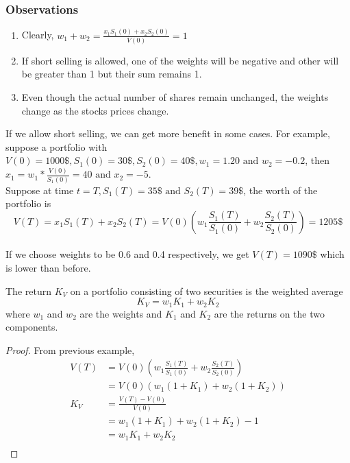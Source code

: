\subsubsection{Observations}
\begin{enumerate}
    \item Clearly, $w_{1}+w_{2}=\frac{x_{1}S_{1}(0)+x_{2}S_{2}(0)}{ V(0)}=1$
    \item If short selling is allowed, one of the weights will be negative and other will be greater than 1 but their sum remains 1.
    \item Even though the actual number of shares remain unchanged, the weights change as the stocks prices change.
\end{enumerate}
If we allow short selling, we can get more benefit in some cases. For example, suppose a portfolio with $V(0)=1000 \$, S_{1}(0)=30 \$, S_{2}(0)=40 \$, w_{1}=1.20 \text{ and } w_{2}=-0.2$, then $x_{1}=w_{1}*\frac{V(0)}{S_{1}(0)}=40 \text{ and } x_{2}=-5$.
\\Suppose at time $t=T, S_{1}(T)=35 \$ \text{ and } S_{2}(T)=39 \$$,
the worth of the portfolio is $$V(T)=x_{1}S_{1}(T)+x_{2}S_{2}(T)=V(0)\left( w_{1}\frac{S_{1}(T)}{S_{1}(0)}+w_{2}\frac{S_{2}(T)}{S_{2}(0)}\right)=1205 \$$$ 
\\If we choose weights to be 0.6 and 0.4 respectively, we get $V(T)=1090 \$$ which is lower than before. 
\newpage
\begin{theorem}
The return $K_{V}$ on a portfolio consisting of two securities is the weighted average 
\begin{equation}
    K_{V}=w_{1}K_{1}+w_{2}K_{2}
\end{equation}
where $w_{1}$ and $w_{2}$ are the weights and $K_{1}$ and $K_{2}$ are the returns on the two components.
\end{theorem}
\begin{proof}
From previous example, \\
\begin{align*}
    V(T)&= V(0)\left(w_{1}\frac{S_{1}(T)}{S_{1}(0)}+w_{2}\frac{S_{2}(T)}{S_{2}(0)}\right)\\
    &=V(0)\left(w_{1}(1+K_{1})+w_{2}(1+K_{2})\right)\\
    K_{V}&=\frac{V(T)-V(0)}{V(0)}\\
    &=w_{1}(1+K_{1})+w_{2}(1+K_{2})-1\\
    &=w_{1}K_{1}+w_{2}K_{2}\\
\end{align*}
\end{proof}
